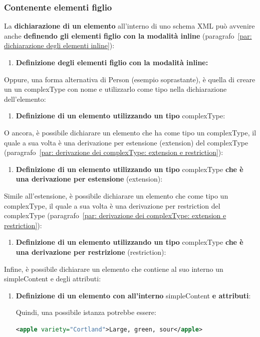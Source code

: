 \documentclass[a4paper]{article}
\begin{document}
	\subsubsection{Contenente elementi figlio}
	
	La \textbf{dichiarazione di un elemento} all'interno di uno schema XML può avvenire anche \textbf{definendo gli elementi figlio con la modalità inline} (paragrafo~\ref{par: dichiarazione degli elementi inline}):
	\begin{enumerate}
		\item \textcolor{Red3}{\textbf{Definizione degli elementi figlio con la modalità inline:}}
		
	\end{enumerate}
	Oppure, una forma alternativa di \textsf{Person} (esempio soprastante), è quella di creare un un \textsf{complexType} con nome e utilizzarlo come tipo nella dichiarazione dell'elemento:
	\begin{enumerate}[resume]
		\item \textcolor{Red3}{\textbf{Definizione di un elemento utilizzando un tipo} \textsf{complexType}:}
		
	\end{enumerate}
	O ancora, è possibile dichiarare un elemento che ha come tipo un \textsf{complexType}, il quale a sua volta è una derivazione per estensione (\textsf{extension}) del \textsf{complexType} (paragrafo~\ref{par: derivazione dei complexType: extension e restriction}):
	\begin{enumerate}[resume]
		\item \textcolor{Red3}{\textbf{Definizione di un elemento utilizzando un tipo} \textsf{complexType} \textbf{che è una derivazione per estensione} (\textsf{extension}):}
		
	\end{enumerate}\newpage
	
	\noindent
	Simile all'estensione, è possibile dichiarare un elemento che come tipo un \textsf{complexType}, il quale a sua volta è una derivazione per \textsf{restriction} del \textsf{complexType} (paragrafo~\ref{par: derivazione dei complexType: extension e restriction}):
	\begin{enumerate}[resume]
		\item \textcolor{Red3}{\textbf{Definizione di un elemento utilizzando un tipo} \textsf{complexType} \textbf{che è una derivazione per restrizione} (\textsf{restriction}):}
		
	\end{enumerate}
	Infine, è possibile dichiarare un elemento che contiene al suo interno un \textsf{simpleContent} e degli attributi:
	\begin{enumerate}[resume]
		\item \textcolor{Red3}{\textbf{Definizione di un elemento con all'interno} \textsf{simpleContent} \textbf{e attributi}:}
		
		Quindi, una possibile istanza potrebbe essere:
		\begin{lstlisting}[language=XML]
<apple variety="Cortland">Large, green, sour</apple>\end{lstlisting}
	\end{enumerate}
	
\end{document}
